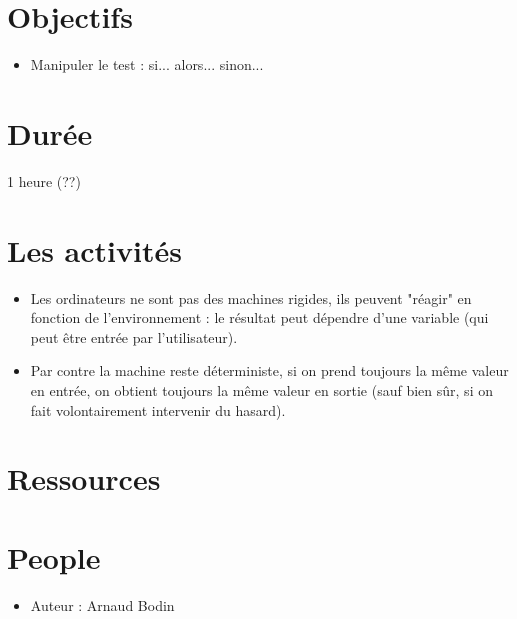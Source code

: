 \documentclass[class=report,crop=false, 12pt]{standalone}
\begin{document}



\section*{Objectifs}

\begin{itemize}
  \item Manipuler le test : si... alors... sinon...
\end{itemize}


\section*{Durée}

1 heure (??)

\section*{Les activités}

\begin{itemize}
  \item Les ordinateurs ne sont pas des machines rigides, ils peuvent "réagir" en fonction de l'environnement : le résultat peut dépendre d'une variable (qui peut être entrée par l'utilisateur).
  
  \item Par contre la machine reste déterministe, si on prend toujours la même valeur en entrée, on obtient toujours la même valeur en sortie (sauf bien sûr, si on fait volontairement intervenir du hasard).
  

\end{itemize}


\section*{Ressources}


\section*{People}

\begin{itemize}
  \item Auteur : Arnaud Bodin
\end{itemize}
\end{document}
